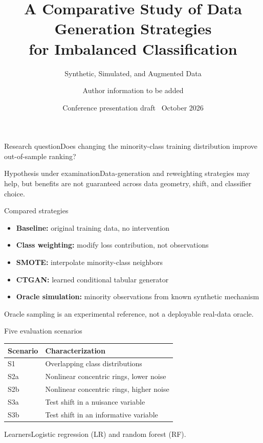 \documentclass[aspectratio=169,11pt]{beamer}
\title{A Comparative Study of Data Generation Strategies\\for Imbalanced Classification}
\subtitle{Synthetic, Simulated, and Augmented Data}
\author{Author information to be added}
\date{Conference presentation draft \textbullet\ October 2026}
\begin{document}
	{\begin{frame}[plain]\titlepage\end{frame}}
	\begin{frame}{Research question}\Large\centering Does changing the minority-class training distribution improve out-of-sample ranking?\vspace{1em}\begin{block}{Hypothesis under examination}\normalsize Data-generation and reweighting strategies may help, but benefits are not guaranteed across data geometry, shift, and classifier choice.\end{block}\end{frame}
	\begin{frame}{Compared strategies}\begin{itemize}\setlength\itemsep{0.65em}\item \textbf{Baseline:} original training data, no intervention\item \textbf{Class weighting:} modify loss contribution, not observations\item \textbf{SMOTE:} interpolate minority-class neighbors\item \textbf{CTGAN:} learned conditional tabular generator\item \textbf{Oracle simulation:} minority observations from known synthetic mechanism\end{itemize}\vspace{0.5em}\footnotesize Oracle sampling is an experimental reference, not a deployable real-data oracle.\end{frame}
	\begin{frame}{Five evaluation scenarios}\begin{tabular}{@{}ll@{}}\toprule Scenario & Characterization\\\midrule S1 & Overlapping class distributions\\ S2a & Nonlinear concentric rings, lower noise\\ S2b & Nonlinear concentric rings, higher noise\\ S3a & Test shift in a nuisance variable\\ S3b & Test shift in an informative variable\\\bottomrule\end{tabular}\vspace{1em}\begin{block}{Learners}Logistic regression (LR) and random forest (RF).\end{block}\end{frame}
\end{document}
